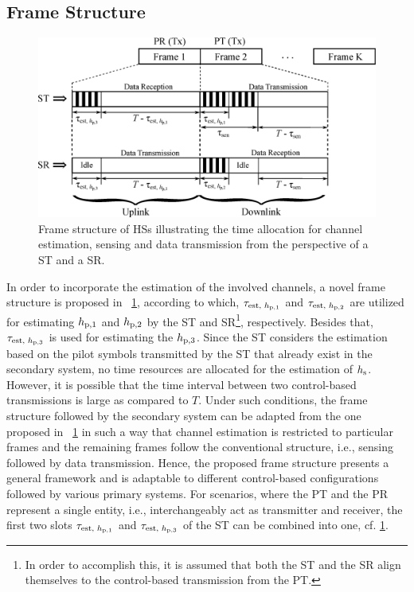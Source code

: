 \subsection{Frame Structure}
\begin{figure}[!t]
\centering
\includegraphics[width = \figscalett]{figures/Frame_Structure}
\caption{Frame structure of HSs illustrating the time allocation for channel estimation, sensing and data transmission from the perspective of a ST and a SR.} 
\label{fig:fs}
\end{figure}
In order to incorporate the estimation of the involved channels, a novel frame structure is proposed in \figurename~\ref{fig:fs}, according to which, $\tau_{\text{est, $h_{\text{p,1}}$}}$ and $\tau_{\text{est, $h_{\text{p,2}}$}}$ are utilized for estimating $h_{\text{p,1}}$ and $h_{\text{p,2}}$ by the ST and SR\footnote{In order to accomplish this, it is assumed that both the ST and the SR align themselves to the control-based transmission from the PT.}, respectively. Besides that, $\tau_{\text{est, $h_{\text{p,3}}$}}$ is used for estimating the $h_{\text{p,3}}$. Since the ST considers the estimation based on the pilot symbols transmitted by the ST that already exist in the secondary system, no time resources are allocated for the estimation of $h_{\text{s}}$. However, it is possible that the time interval between two control-based transmissions is large as compared to $T$. Under such conditions, the frame structure followed by the secondary system can be adapted from the one proposed in \figurename~\ref{fig:fs} in such a way that channel estimation is restricted to particular frames and the remaining frames follow the conventional structure, i.e., sensing followed by data transmission. Hence, the proposed frame structure presents a general framework and is adaptable to different control-based configurations followed by various primary systems. For scenarios, where the PT and the PR represent a single entity, i.e., interchangeably act as transmitter and receiver, the first two slots $\tau_{\text{est, $h_{\text{p,1}}$}}$ and $\tau_{\text{est, $h_{\text{p,3}}$}}$ of the ST can be combined into one, cf. \figurename\ref{fig:fs}. 


